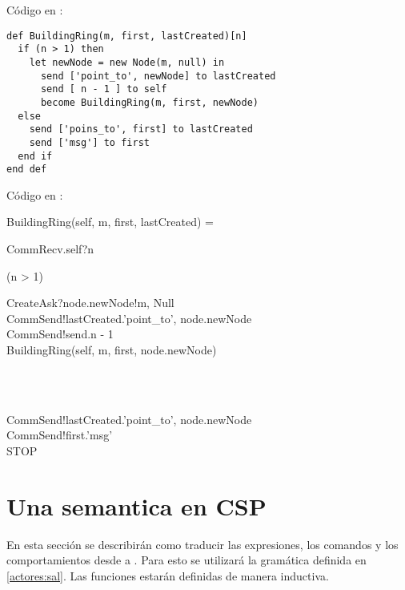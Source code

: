 Código en \SAL:

\begin{lstlisting}[language=sal, style=simple]
def BuildingRing(m, first, lastCreated)[n]
  if (n > 1) then
    let newNode = new Node(m, null) in
      send ['point_to', newNode] to lastCreated
      send [ n - 1 ] to self
      become BuildingRing(m, first, newNode)
  else
    send ['poins_to', first] to lastCreated
    send ['msg'] to first
  end if
end def
\end{lstlisting}

Código en \CSP:

\begin{process}
BuildingRing(self, m, first, lastCreated) = \\ \quad
  \begin{block}
  CommRecv.self?\langle n \rangle \then \\ \quad
  \begin{block} 
  \If (n > 1) \Then {} \\ \quad
    \begin{block} 
    CreateAsk?node.newNode!\langle m, Null \rangle \then \\
    CommSend!lastCreated.\langle 'point_to', node.newNode \rangle \then \\
    CommSend!send.\langle n - 1 \rangle \then \\
    BuildingRing(self, m, first, node.newNode) 
    \end{block} \\
  \Else {} \\ \quad
    \begin{block}
    CommSend!lastCreated.\langle 'point_to', node.newNode \rangle \then \\
    CommSend!first.\langle 'msg' \rangle \then \\
    STOP
    \end{block}
  \end{block} 
\end{block}
\end{process}

\section{Una semantica en CSP}

En esta sección se describirán como traducir las expresiones, los comandos y los comportamientos desde \SAL a \CSP. Para esto se utilizará la gramática definida en \ref{actores:sal}. Las funciones estarán definidas de manera inductiva.

